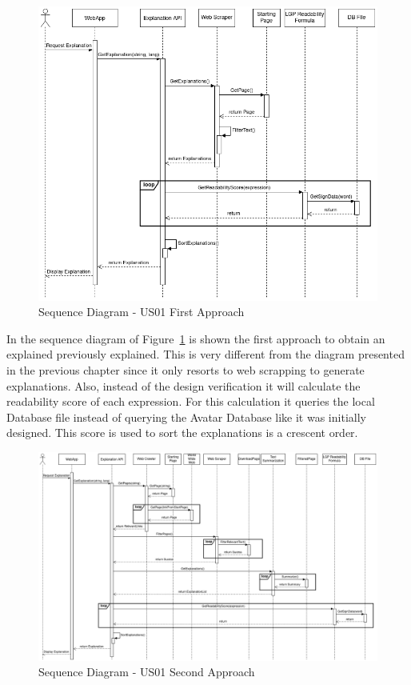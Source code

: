\begin{figure}[H]
\centering
\includegraphics[scale=0.45]{ch5/assets/US01_SD_Implement_Ap1.png}
\caption[Sequence Diagram US01 First Approach]{Sequence Diagram - US01 First Approach}
\label{fig:uc01Imp1}
\end{figure}

In the sequence diagram of Figure~\ref{fig:uc01Imp1} is shown the first approach to obtain an explained previously explained.
This is very different from the diagram presented in the previous chapter since it only resorts to web scrapping to generate explanations.
Also, instead of the design verification it will calculate the readability score of each expression.
For this calculation it queries the local Database file instead of querying the Avatar Database like it was initially designed.
This score is used to sort the explanations is a crescent order.

\begin{figure}[H]
\centering
\includegraphics[width=\textwidth]{ch5/assets/US01_SD_Implement_Ap2.png}
\caption[Sequence Diagram US01 Second Approach]{Sequence Diagram - US01 Second Approach}
\label{fig:uc01Imp2}
\end{figure}

